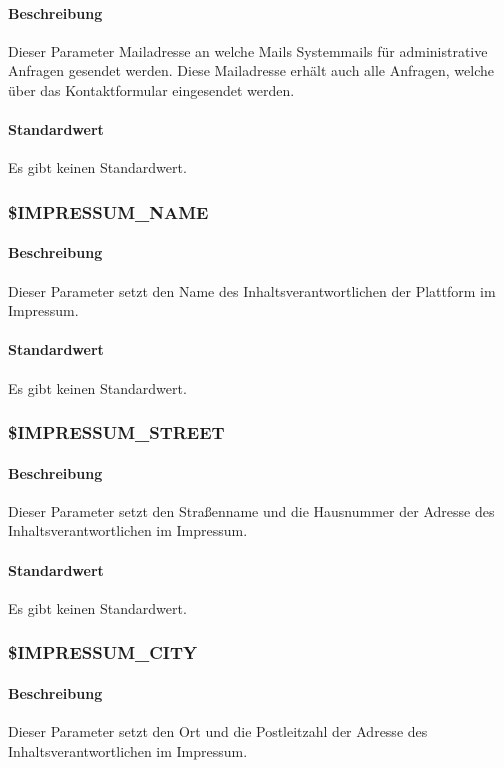 \paragraph{Beschreibung}Dieser Parameter Mailadresse an welche Mails Systemmails für administrative Anfragen gesendet werden. Diese Mailadresse erhält auch alle Anfragen, welche über das Kontaktformular eingesendet werden.
\paragraph{Standardwert}Es gibt keinen Standardwert.

\subsubsection{\$IMPRESSUM\_NAME}\label{config:impressum-name}
\paragraph{Beschreibung}Dieser Parameter setzt den Name des Inhaltsverantwortlichen der Plattform im Impressum.
\paragraph{Standardwert}Es gibt keinen Standardwert.

\subsubsection{\$IMPRESSUM\_STREET}\label{config:impressum-street}
\paragraph{Beschreibung}Dieser Parameter setzt den Straßenname und die Hausnummer der Adresse des Inhaltsverantwortlichen im Impressum.
\paragraph{Standardwert}Es gibt keinen Standardwert.

\subsubsection{\$IMPRESSUM\_CITY}\label{config:impressum-city}
\paragraph{Beschreibung}Dieser Parameter setzt den Ort und die Postleitzahl der Adresse des Inhaltsverantwortlichen im Impressum.
